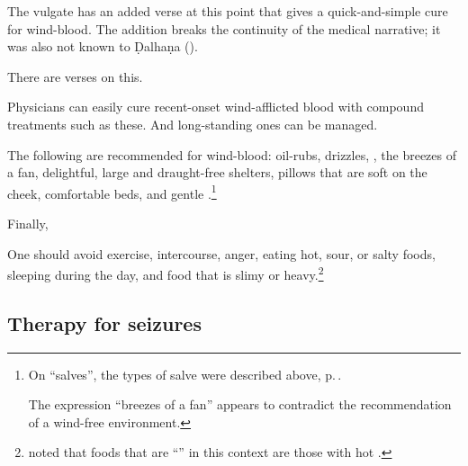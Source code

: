 \begin{translation}
{    The vulgate has an added verse at this point that gives a quick-and-simple cure for wind-blood.  The addition breaks 
    the continuity of the medical narrative; it was also not known to Ḍalhaṇa ().}
 
 
     
\item[14]

There are verses on this.

\begin{sloka}
Physicians can easily cure recent-onset
wind-afflicted blood with compound treatments such as these.  
And long-standing ones can be managed.
\end{sloka}

\item[15--16]

\begin{sloka}    
    The following are recommended for wind-blood: oil-rubs, drizzles,  , the breezes of a
    fan,  delightful, large and draught-free shelters,  
        pillows that are soft on the cheek, 
        comfortable beds, 
       and gentle .\footnote{On
           “salves”, the types of salve were
           described above, p.\,\pageref{pradeha}.
           
           The expression  “breezes of a fan” appears to
           contradict the recommendation of a wind-free
           environment.}
\end{sloka}

\item[17]

Finally,
\begin{sloka}
    One should avoid exercise, intercourse, anger, eating hot, sour,
or salty foods, sleeping during the day, and food that is slimy or
heavy.\footnote{ noted that foods that are
    “” in this context are those with hot
    .}
\end{sloka}

\subsection{Therapy for seizures}

\item[18]


\end{translation}

